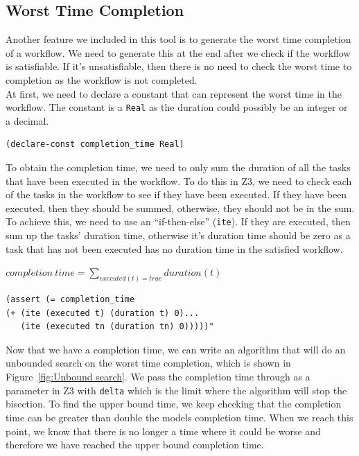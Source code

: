 \documentclass[a4paper]{report}
\begin{document}
\subsection{Worst Time Completion}
Another feature we included in this tool is to generate the worst time completion of a workflow. We need to generate this at the end after we check if the workflow is satisfiable. If it's unsatisfiable, then there is no need to check the worst time to completion as the workflow is not completed.\\

At first, we need to declare a constant that can represent the worst time in the workflow. The constant is a \texttt{Real} as the duration could possibly be an integer or a decimal. 
\begin{lstlisting}[frame=single]
(declare-const completion_time Real)
\end{lstlisting}

To obtain the completion time, we need to only sum the duration of all the tasks that have been executed in the workflow. To do this in Z3, we need to check each of the tasks in the workflow to see if they have been executed. If they have been executed, then they should be summed, otherwise, they should not be in the sum. To achieve this, we need to use an ``if-then-else'' (\texttt{ite}). If they are executed, then sum up the tasks' duration time, otherwise it's duration time should be zero as a task that has not been executed has no duration time in the satisfied workflow.
\begin{center}
$completion\ time = \sum\nolimits_{executed(t) = true} duration(t)$
\end{center}
\begin{lstlisting}[frame=single]
(assert (= completion_time
(+ (ite (executed t) (duration t) 0)...
   (ite (executed tn (duration tn) 0)))))"
\end{lstlisting}

Now that we have a completion time, we can write an algorithm that will do an unbounded search on the worst time completion, which is shown in Figure~\ref{fig:Unbound search}. We pass the completion time through as a parameter in Z3 with \texttt{delta} which is the limit where the algorithm will stop the bisection. To find the upper bound time, we keep checking that the completion time can be greater than double the models completion time. When we reach this point, we know that there is no longer a time where it could be worse and therefore we have reached the upper bound completion time. \\
\end{document}
